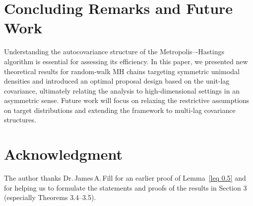 \documentclass[conference]{IEEEtran}
\theoremstyle{definition}
\begin{document}
\section{Concluding Remarks and Future Work}
Understanding the autocovariance structure of the Metropolis–-Hastings algorithm is essential for assessing its efficiency. In this paper, we presented new theoretical results for random-walk MH chains targeting symmetric unimodal densities and introduced an optimal proposal design based on the unit-lag covariance, ultimately relating the analysis to high-dimensional settings in an asymmetric sense. Future work will focus on relaxing the restrictive assumptions on target distributions and extending the framework to multi-lag covariance structures.


\section*{Acknowledgment}
The author thanks Dr.\,James\,A.\,Fill for an earlier proof of Lemma~\ref{leq 0.5} and for helping us to formulate the statements and proofs of the results in Section 3 (especially Theorems 3.4--3.5).
\balance


\end{document}
